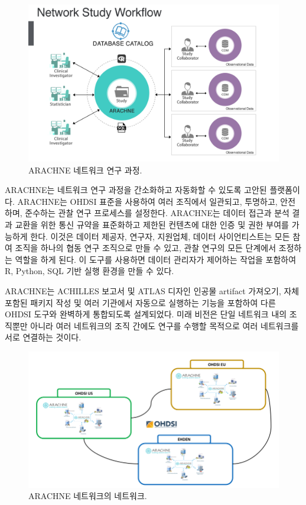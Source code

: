\documentclass[10.5pt]{book}
\theoremstyle{definition}
\theoremstyle{definition}
\theoremstyle{definition}
\theoremstyle{remark}
\begin{document}
\begin{figure}[h]

{\centering \includegraphics[width=0.9\linewidth]{images/NetworkStudies/ARACHNE} 

}

\caption{ARACHNE 네트워크 연구 과정.}\label{fig:arachne}
\end{figure}

ARACHNE는 네트워크 연구 과정을 간소화하고 자동화할 수 있도록 고안된
플랫폼이다. ARACHNE는 OHDSI 표준을 사용하여 여러 조직에서 일관되고,
투명하고, 안전하며, 준수하는 관찰 연구 프로세스를 설정한다. ARACHNE는
데이터 접근과 분석 결과 교환을 위한 통신 규약을 표준화하고 제한된
컨텐츠에 대한 인증 및 권한 부여를 가능하게 한다. 이것은 데이터 제공자,
연구자, 지원업체, 데이터 사이언티스트는 모든 참여 조직을 하나의 협동
연구 조직으로 만들 수 있고, 관찰 연구의 모든 단계에서 조정하는 역할을
하게 된다. 이 도구를 사용하면 데이터 관리자가 제어하는 작업을 포함하여
R, Python, SQL 기반 실행 환경을 만들 수 있다.

ARACHNE는 ACHILLES 보고서 및 ATLAS 디자인 인공물 artifact 가져오기, 자체
포함된 패키지 작성 및 여러 기관에서 자동으로 실행하는 기능을 포함하여
다른 OHDSI 도구와 완벽하게 통합되도록 설계되었다. 미래 비전은 단일
네트워크 내의 조직뿐만 아니라 여러 네트워크의 조직 간에도 연구를 수행할
목적으로 여러 네트워크를 서로 연결하는 것이다.

\begin{figure}[h]

{\centering \includegraphics[width=0.9\linewidth]{images/NetworkStudies/ARACHNENON} 

}

\caption{ARACHNE 네트워크의 네트워크.}\label{fig:arachneNon}
\end{figure}
\end{document}
